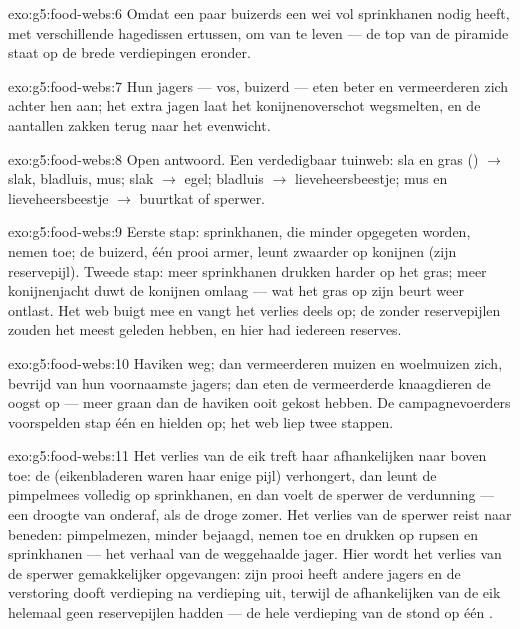 \begin{solution}{exo:g5:food-webs:6}
Omdat een paar buizerds een wei vol sprinkhanen nodig heeft, met
verschillende hagedissen ertussen, om van te leven --- de top van de
piramide staat op de brede verdiepingen eronder.
\end{solution}

\begin{solution}{exo:g5:food-webs:7}
Hun jagers --- vos, buizerd --- eten beter en vermeerderen zich achter
hen aan; het extra jagen laat het konijnenoverschot wegsmelten, en de
aantallen zakken terug naar het evenwicht.
\end{solution}

\begin{solution}{exo:g5:food-webs:8}
Open antwoord. Een verdedigbaar tuinweb: sla en gras ()
$\rightarrow$ slak, bladluis, mus; slak $\rightarrow$ egel; bladluis
$\rightarrow$ lieveheersbeestje; mus en lieveheersbeestje $\rightarrow$
buurtkat of sperwer.
\end{solution}

\begin{solution}{exo:g5:food-webs:9}
Eerste stap: sprinkhanen, die minder opgegeten worden, nemen toe; de
buizerd, één prooi armer, leunt zwaarder op konijnen (zijn reservepijl).
Tweede stap: meer sprinkhanen drukken harder op het gras; meer
konijnenjacht duwt de konijnen omlaag --- wat het gras op zijn beurt
weer ontlast. Het web buigt mee en vangt het verlies deels op; de
 zonder reservepijlen zouden het meest geleden hebben, en hier
had iedereen reserves.
\end{solution}

\begin{solution}{exo:g5:food-webs:10}
Haviken weg; dan vermeerderen muizen en woelmuizen zich, bevrijd van hun
voornaamste jagers; dan eten de vermeerderde knaagdieren de oogst op ---
meer graan dan de haviken ooit gekost hebben. De campagnevoerders
voorspelden stap één en hielden op; het web liep twee stappen.
\end{solution}

\begin{solution}{exo:g5:food-webs:11}
Het verlies van de eik treft haar afhankelijken naar boven toe: de 
(eikenbladeren waren haar enige pijl) verhongert, dan leunt de
pimpelmees volledig op sprinkhanen, en dan voelt de sperwer de
verdunning --- een droogte van onderaf, als de droge zomer. Het verlies
van de sperwer reist naar beneden: pimpelmezen, minder bejaagd, nemen
toe en drukken op rupsen en sprinkhanen --- het verhaal van de
weggehaalde jager. Hier wordt het verlies van de sperwer gemakkelijker
opgevangen: zijn prooi heeft andere jagers en de verstoring dooft
verdieping na verdieping uit, terwijl de afhankelijken van de eik
helemaal geen reservepijlen hadden --- de hele verdieping van de 
stond op één .
\end{solution}
